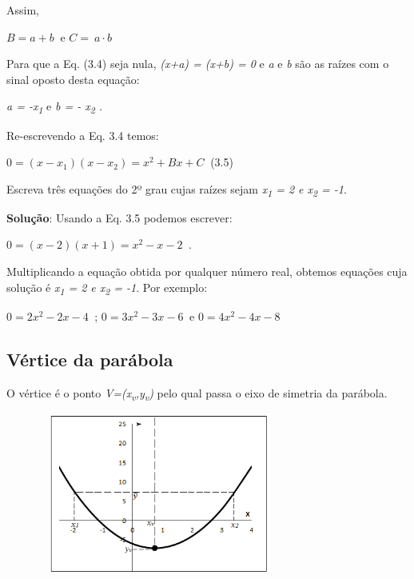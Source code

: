 Assim,

 \( B=a+b _{~ } \)  e  \( C=~a \cdot  b  _{~ } \) 

Para que a Eq. (3.4) seja nula, \textit{(x+a) = (x+b) = 0}   e  \textit{a} e \textit{b} são as raízes com o sinal oposto desta equação:

 \textit{a = -x\textsubscript{1}} e \textit{b = - x\textsubscript{2} . }

Re-escrevendo a Eq. 3.4 temos:

 \( 0= \left( x-x_{1} \right)  \left( x-x_{2} \right) = x^{2}+Bx+C_{~ } \) \tab (3.5)

\begin{texemplo}
Escreva três equações do 2º grau cujas raízes sejam  \textit{x\textsubscript{1} = 2  e x\textsubscript{2} = -1}. 

\textbf{Solução}: Usando a Eq. 3.5 podemos escrever:

 \( 0= \left( x-2 \right)  \left( x+1 \right) = x^{2}-x-2_{~ } \) .

Multiplicando a equação obtida por qualquer número real, obtemos equações cuja solução é  \textit{x\textsubscript{1} = 2  e x\textsubscript{2} = -1}.   Por exemplo:

 \( 0=2x^{2}-2x-4_{~ } \)    ;       \( 0=3x^{2}-3x-6_{~ } \)    e      \( 0=4x^{2}-4x-8_{~ } \)   \qedsymbol{}
\end{texemplo}

\subsection{Vértice da parábola}

O vértice é o ponto \textit{V=(x\textsubscript{v},y\textsubscript{v})} pelo qual passa o eixo de simetria da parábola. 

\begin{figure}[H]
	\begin{Center}
		\includegraphics[width=3.15in,height=2.07in]{capitulos/funcao_do_segundo_grau/media/image6.png}
	\end{Center}
\end{figure}

